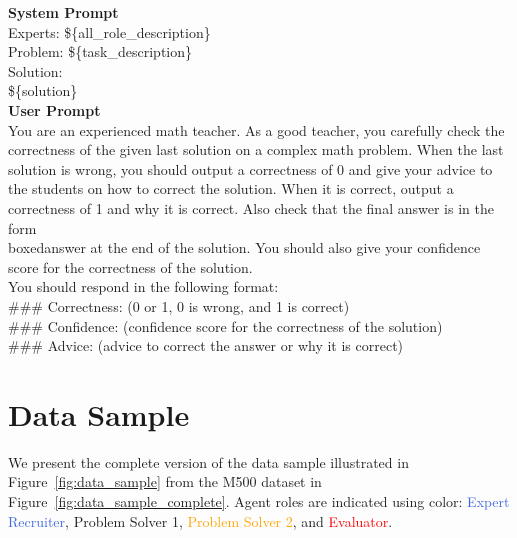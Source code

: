 \begin{tcolorbox}[
  title=Evaluator Prompts,
  breakable,
  colback=white,
  colframe=black
]

\textbf{System Prompt} \\
Experts: \$\{all\_role\_description\} \\
Problem: \$\{task\_description\} \\
Solution: \\
\$\{solution\} \\

\textbf{User Prompt} \\
You are an experienced math teacher. As a good teacher, you carefully check the correctness of the given last solution on a complex math problem. When the last solution is wrong, you should output a correctness of 0 and give your advice to the students on how to correct the solution. When it is correct, output a correctness of 1 and why it is correct. Also check that the final answer is in the form \\boxed{answer} at the end of the solution. You should also give your confidence score for the correctness of the solution. \\

You should respond in the following format: \\
\#\#\# Correctness: (0 or 1, 0 is wrong, and 1 is correct) \\
\#\#\# Confidence: (confidence score for the correctness of the solution) \\
\#\#\# Advice: (advice to correct the answer or why it is correct) \\

\end{tcolorbox}




\section{Data Sample}
We present the complete version of the data sample illustrated in Figure~\ref{fig:data_sample} from the M500 dataset in Figure~\ref{fig:data_sample_complete}. Agent roles are indicated using color: \textcolor{royalblue}{Expert Recruiter}, \textcolor{olivegreen}{Problem Solver 1}, \textcolor{orange}{Problem Solver 2}, and \textcolor{red}{Evaluator}.


